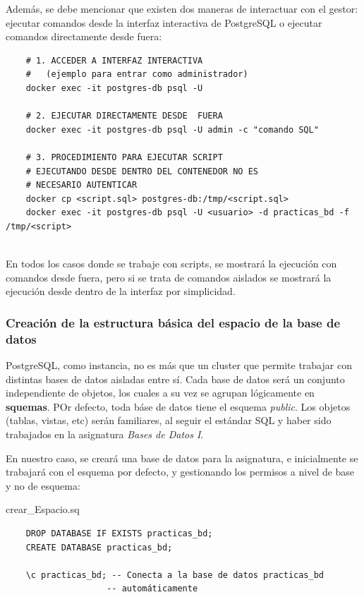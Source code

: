 \documentclass{article}
\begin{document}
Además, se debe mencionar que existen dos maneras de interactuar con el gestor: ejecutar comandos desde la interfaz interactiva de PostgreSQL o ejecutar comandos directamente desde fuera:
\begin{lstlisting}
    # 1. ACCEDER A INTERFAZ INTERACTIVA
    #   (ejemplo para entrar como administrador)
    docker exec -it postgres-db psql -U

    # 2. EJECUTAR DIRECTAMENTE DESDE  FUERA
    docker exec -it postgres-db psql -U admin -c "comando SQL"

    # 3. PROCEDIMIENTO PARA EJECUTAR SCRIPT
    # EJECUTANDO DESDE DENTRO DEL CONTENEDOR NO ES
    # NECESARIO AUTENTICAR
    docker cp <script.sql> postgres-db:/tmp/<script.sql>
    docker exec -it postgres-db psql -U <usuario> -d practicas_bd -f /tmp/<script>


\end{lstlisting}
En todos los casos donde se trabaje con scripts, se mostrará la ejecución con comandos desde fuera, pero si se trata de comandos aislados se mostrará la ejecución desde dentro de la interfaz por simplicidad.

\subsubsection{Creación de la estructura básica del espacio de la base de datos}

PostgreSQL, como instancia, no es más que un cluster que permite trabajar con distintas bases de datos aisladas entre sí. Cada base de datos será un conjunto independiente de objetos, los cuales a su vez se agrupan lógicamente en \textbf{squemas}. POr defecto, toda báse de datos tiene el esquema \textit{public}. Los objetos (tablas, vistas, etc) serán familiares, al seguir el estándar SQL y haber sido trabajados en la asignatura \textit{Bases de Datos I}.

En nuestro caso, se creará una base de datos para la asignatura, e inicialmente se trabajará con el esquema por defecto, y gestionando los permisos a nivel de base y no de esquema:
\begin{scriptbox}{crear\_Espacio.sq}
\begin{verbatim}
    DROP DATABASE IF EXISTS practicas_bd;
    CREATE DATABASE practicas_bd;

    \c practicas_bd; -- Conecta a la base de datos practicas_bd 
                    -- automáticamente
\end{verbatim}
\end{scriptbox}
\end{document}
